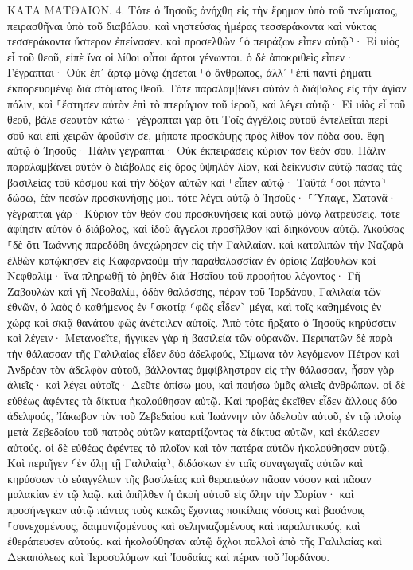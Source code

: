 \documentclass[twoside, 9pt]{extreport}
\begin{document}
ΚΑΤΑ ΜΑΤΘΑΙΟΝ.
4.
Τότε ὁ Ἰησοῦς ἀνήχθη εἰς τὴν ἔρημον ὑπὸ τοῦ πνεύματος, πειρασθῆναι ὑπὸ τοῦ διαβόλου. 
καὶ νηστεύσας ἡμέρας τεσσεράκοντα καὶ νύκτας τεσσεράκοντα ὕστερον ἐπείνασεν. 
καὶ προσελθὼν ⸂ὁ πειράζων εἶπεν αὐτῷ⸃· Εἰ υἱὸς εἶ τοῦ θεοῦ, εἰπὲ ἵνα οἱ λίθοι οὗτοι ἄρτοι γένωνται. 
ὁ δὲ ἀποκριθεὶς εἶπεν· Γέγραπται· Οὐκ ἐπ᾽ ἄρτῳ μόνῳ ζήσεται ⸀ὁ ἄνθρωπος, ἀλλ᾽ ⸀ἐπὶ παντὶ ῥήματι ἐκπορευομένῳ διὰ στόματος θεοῦ. 
Τότε παραλαμβάνει αὐτὸν ὁ διάβολος εἰς τὴν ἁγίαν πόλιν, καὶ ⸀ἔστησεν αὐτὸν ἐπὶ τὸ πτερύγιον τοῦ ἱεροῦ, 
καὶ λέγει αὐτῷ· Εἰ υἱὸς εἶ τοῦ θεοῦ, βάλε σεαυτὸν κάτω· γέγραπται γὰρ ὅτι Τοῖς ἀγγέλοις αὐτοῦ ἐντελεῖται περὶ σοῦ καὶ ἐπὶ χειρῶν ἀροῦσίν σε, μήποτε προσκόψῃς πρὸς λίθον τὸν πόδα σου. 
ἔφη αὐτῷ ὁ Ἰησοῦς· Πάλιν γέγραπται· Οὐκ ἐκπειράσεις κύριον τὸν θεόν σου. 
Πάλιν παραλαμβάνει αὐτὸν ὁ διάβολος εἰς ὄρος ὑψηλὸν λίαν, καὶ δείκνυσιν αὐτῷ πάσας τὰς βασιλείας τοῦ κόσμου καὶ τὴν δόξαν αὐτῶν 
καὶ ⸀εἶπεν αὐτῷ· Ταῦτά ⸂σοι πάντα⸃ δώσω, ἐὰν πεσὼν προσκυνήσῃς μοι. 
τότε λέγει αὐτῷ ὁ Ἰησοῦς· ⸀Ὕπαγε, Σατανᾶ· γέγραπται γάρ· Κύριον τὸν θεόν σου προσκυνήσεις καὶ αὐτῷ μόνῳ λατρεύσεις. 
τότε ἀφίησιν αὐτὸν ὁ διάβολος, καὶ ἰδοὺ ἄγγελοι προσῆλθον καὶ διηκόνουν αὐτῷ. 
Ἀκούσας ⸀δὲ ὅτι Ἰωάννης παρεδόθη ἀνεχώρησεν εἰς τὴν Γαλιλαίαν. 
καὶ καταλιπὼν τὴν Ναζαρὰ ἐλθὼν κατῴκησεν εἰς Καφαρναοὺμ τὴν παραθαλασσίαν ἐν ὁρίοις Ζαβουλὼν καὶ Νεφθαλίμ· 
ἵνα πληρωθῇ τὸ ῥηθὲν διὰ Ἠσαΐου τοῦ προφήτου λέγοντος· 
Γῆ Ζαβουλὼν καὶ γῆ Νεφθαλίμ, ὁδὸν θαλάσσης, πέραν τοῦ Ἰορδάνου, Γαλιλαία τῶν ἐθνῶν, 
ὁ λαὸς ὁ καθήμενος ἐν ⸀σκοτίᾳ ⸂φῶς εἶδεν⸃ μέγα, καὶ τοῖς καθημένοις ἐν χώρᾳ καὶ σκιᾷ θανάτου φῶς ἀνέτειλεν αὐτοῖς. 
Ἀπὸ τότε ἤρξατο ὁ Ἰησοῦς κηρύσσειν καὶ λέγειν· Μετανοεῖτε, ἤγγικεν γὰρ ἡ βασιλεία τῶν οὐρανῶν. 
Περιπατῶν δὲ παρὰ τὴν θάλασσαν τῆς Γαλιλαίας εἶδεν δύο ἀδελφούς, Σίμωνα τὸν λεγόμενον Πέτρον καὶ Ἀνδρέαν τὸν ἀδελφὸν αὐτοῦ, βάλλοντας ἀμφίβληστρον εἰς τὴν θάλασσαν, ἦσαν γὰρ ἁλιεῖς· 
καὶ λέγει αὐτοῖς· Δεῦτε ὀπίσω μου, καὶ ποιήσω ὑμᾶς ἁλιεῖς ἀνθρώπων. 
οἱ δὲ εὐθέως ἀφέντες τὰ δίκτυα ἠκολούθησαν αὐτῷ. 
Καὶ προβὰς ἐκεῖθεν εἶδεν ἄλλους δύο ἀδελφούς, Ἰάκωβον τὸν τοῦ Ζεβεδαίου καὶ Ἰωάννην τὸν ἀδελφὸν αὐτοῦ, ἐν τῷ πλοίῳ μετὰ Ζεβεδαίου τοῦ πατρὸς αὐτῶν καταρτίζοντας τὰ δίκτυα αὐτῶν, καὶ ἐκάλεσεν αὐτούς. 
οἱ δὲ εὐθέως ἀφέντες τὸ πλοῖον καὶ τὸν πατέρα αὐτῶν ἠκολούθησαν αὐτῷ. 
Καὶ περιῆγεν ⸂ἐν ὅλῃ τῇ Γαλιλαίᾳ⸃, διδάσκων ἐν ταῖς συναγωγαῖς αὐτῶν καὶ κηρύσσων τὸ εὐαγγέλιον τῆς βασιλείας καὶ θεραπεύων πᾶσαν νόσον καὶ πᾶσαν μαλακίαν ἐν τῷ λαῷ. 
καὶ ἀπῆλθεν ἡ ἀκοὴ αὐτοῦ εἰς ὅλην τὴν Συρίαν· καὶ προσήνεγκαν αὐτῷ πάντας τοὺς κακῶς ἔχοντας ποικίλαις νόσοις καὶ βασάνοις ⸀συνεχομένους, δαιμονιζομένους καὶ σεληνιαζομένους καὶ παραλυτικούς, καὶ ἐθεράπευσεν αὐτούς. 
καὶ ἠκολούθησαν αὐτῷ ὄχλοι πολλοὶ ἀπὸ τῆς Γαλιλαίας καὶ Δεκαπόλεως καὶ Ἱεροσολύμων καὶ Ἰουδαίας καὶ πέραν τοῦ Ἰορδάνου. 
\end{document}
